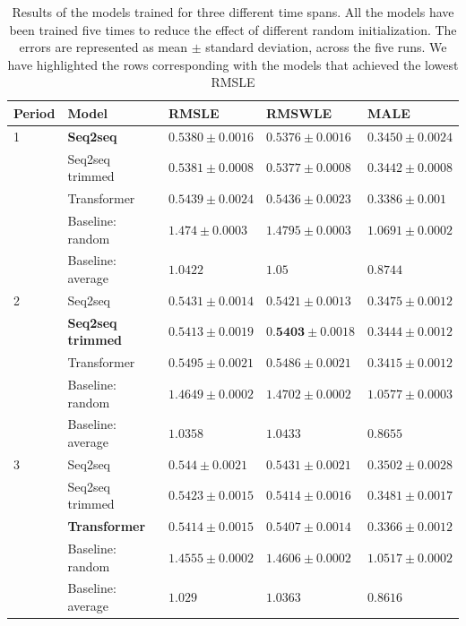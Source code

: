 \documentclass{elsarticle}
\begin{document}
	\begin{table}[!h]
		\footnotesize
		\caption{Results of the models trained for three different time spans. All the models have been trained five times to reduce the effect of different random initialization. The errors are represented as mean $\pm$ standard deviation, across the five runs. We have highlighted the rows corresponding with the models that achieved the lowest RMSLE}
		\label{tab:results}
		\centering
	\begin{tabular}{lllll}
		\hline
		Period & Model             & RMSLE                 & RMSWLE                & MALE                  \\ \hline
		1      & \textbf{Seq2seq}           & $ \mathbf{0.5380 \pm 0.0016} $  & $ \mathbf{0.5376 \pm 0.0016 }$ & $  \mathbf{0.3450 \pm 0.0024}$  \\
		       & Seq2seq trimmed   & $ 0.5381 \pm 0.0008 $ & $ 0.5377 \pm 0.0008 $ & $ 0.3442 \pm 0.0008 $ \\
		       & Transformer       & $ 0.5439 \pm 0.0024 $ & $ 0.5436 \pm 0.0023 $ & $ 0.3386 \pm 0.001 $  \\
		       & Baseline: random  & $ 1.474 \pm 0.0003 $  & $ 1.4795 \pm 0.0003 $ & $ 1.0691 \pm 0.0002 $ \\
		       & Baseline: average & $ 1.0422$             & $ 1.05$               & $ 0.8744$             \\ \hline
		2      & Seq2seq           & $ 0.5431 \pm 0.0014 $ & $ 0.5421 \pm 0.0013 $ & $ 0.3475 \pm 0.0012 $ \\
		       & \textbf{Seq2seq trimmed }  & $ \mathbf{0.5413 \pm 0.0019} $ & $ 0.\mathbf{5403 \pm 0.0018 }$ & $ \mathbf{0.3444 \pm 0.0012} $ \\
		       & Transformer       & $ 0.5495 \pm 0.0021 $ & $ 0.5486 \pm 0.0021 $ & $ 0.3415 \pm 0.0012 $ \\
		       & Baseline: random  & $ 1.4649 \pm 0.0002 $ & $ 1.4702 \pm 0.0002 $ & $ 1.0577 \pm 0.0003 $ \\
		       & Baseline: average & $ 1.0358$             & $ 1.0433$             & $ 0.8655$             \\ \hline
		3      & Seq2seq           & $ 0.544 \pm 0.0021 $  & $ 0.5431 \pm 0.0021 $ & $ 0.3502 \pm 0.0028 $ \\
		       & Seq2seq trimmed   & $ 0.5423 \pm 0.0015 $ & $ 0.5414 \pm 0.0016 $ & $ 0.3481 \pm 0.0017 $ \\
		       & \textbf{Transformer}       & $ \mathbf{0.5414 \pm 0.0015} $ & $ \mathbf{0.5407 \pm 0.0014} $ & $ \mathbf{0.3366 \pm 0.0012} $ \\
		       & Baseline: random  & $ 1.4555 \pm 0.0002 $ & $ 1.4606 \pm 0.0002 $ & $ 1.0517 \pm 0.0002 $ \\
		       & Baseline: average & $ 1.029$              & $ 1.0363 $            & $ 0.8616$             \\ \hline
	\end{tabular}
    \end{table}
\end{document}
